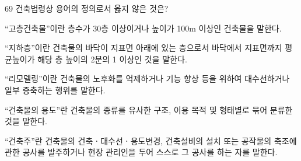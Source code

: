 \begin{question}{69}
건축법령상 용어의 정의로서 옳지 않은 것은?
\begin{choices}
  \item “고층건축물”이란 층수가 30층 이상이거나 높이가 100m 이상인 건축물을 말한다.
  \item “지하층”이란 건축물의 바닥이 지표면 아래에 있는 층으로서 바닥에서 지표면까지 평균높이가 해당 층 높이의 2분의 1 이상인 것을 말한다.
  \item “리모델링”이란 건축물의 노후화를 억제하거나 기능 향상 등을 위하여 대수선하거나 일부 증축하는 행위를 말한다.
  \item “건축물의 용도”란 건축물의 종류를 유사한 구조, 이용 목적 및 형태별로 묶어 분류한 것을 말한다.
  \item “건축주”란 건축물의 건축ㆍ대수선ㆍ용도변경, 건축설비의 설치 또는 공작물의 축조에 관한 공사를 발주하거나 현장 관리인을 두어 스스로 그 공사를 하는 자를 말한다.
\end{choices}
\end{question}
